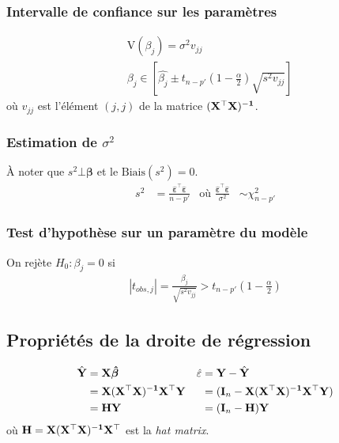 \documentclass[10pt, french]{article}
\begin{document}
\begin{multicols*}{3}
\subsubsection*{Intervalle de confiance sur les paramètres}
\begin{align*}
&\text{V}(\beta_j) = \sigma^2 v_{jj} \\
&\beta_j \in \left[ \hat{\beta_j} \pm t_{n-p'} \left(1- \frac{\alpha}{2} \right) \sqrt{s^2 v_{jj}} \right]
\end{align*}
où $v_{jj}$ est l'élément $(j,j)$ de la matrice $\mathbf{(X^\top X)^{-1}}$.

\subsubsection*{Estimation de $\sigma^2$}
À noter que $s^{2}\bot \bm{\beta}$ et le $\text{Biais}(s^{2}) = 0$.\\
\begin{align*}
s^2 &= \frac{\hat{\bm{\varepsilon}}^\top \hat{\bm{\varepsilon}}}{n-p'} &\text{où } \frac{\bm{\hat\varepsilon}^{\top}\bm{\hat\varepsilon}}{\sigma^{2}} &\sim \chi^{2}_{n - p'}
\end{align*}

\subsubsection*{Test d'hypothèse sur un paramètre du modèle}
On rejète $H_0 : \beta_j = 0$ si
\begin{align*}
|t_{obs, j}| = \frac{\beta_j}{\sqrt{s^2 v_{jj}} } > t_{n-p'}\left(1 - \frac{\alpha}{2} \right) 
\end{align*}

\subsection*{Propriétés de la droite de régression}
\begin{align*}
\hat{\mathbf{Y}} 
	&= \mathbf{X} \bm{\hat{\beta}}  &
\hat{\varepsilon} 
	&= \mathbf{Y} - \hat{\mathbf{Y}} \\
	&= \mathbf{X(X^\top X)^{-1} X^\top Y} &
	&= (\mathbf{I}_n - \mathbf{X(X^\top X)^{-1} X^\top Y}) \\
	&= \mathbf{H Y}  &
	&= (\mathbf{I}_n - \mathbf{H})\mathbf{Y} 
\end{align*}	
où $\mathbf{H = X(X^\top X)^{-1}X^\top}$ est la \textit{hat matrix}.\\


\end{multicols*}
\end{document}
